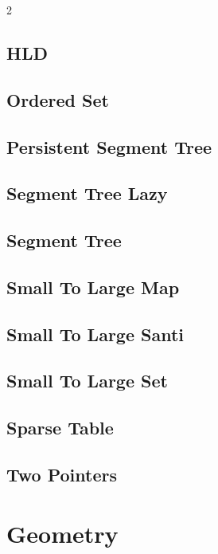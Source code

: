 \documentclass[a4paper,landscape,10pt]{article}
\begin{document}
\begin{multicols*}{2}
\subsection{HLD}

\subsection{Ordered Set}

\subsection{Persistent Segment Tree}

\subsection{Segment Tree Lazy}

\subsection{Segment Tree}

\subsection{Small To Large Map}

\subsection{Small To Large Santi}

\subsection{Small To Large Set}

\subsection{Sparse Table}

\subsection{Two Pointers}

\section{Geometry}

\end{multicols*}
\end{document}
